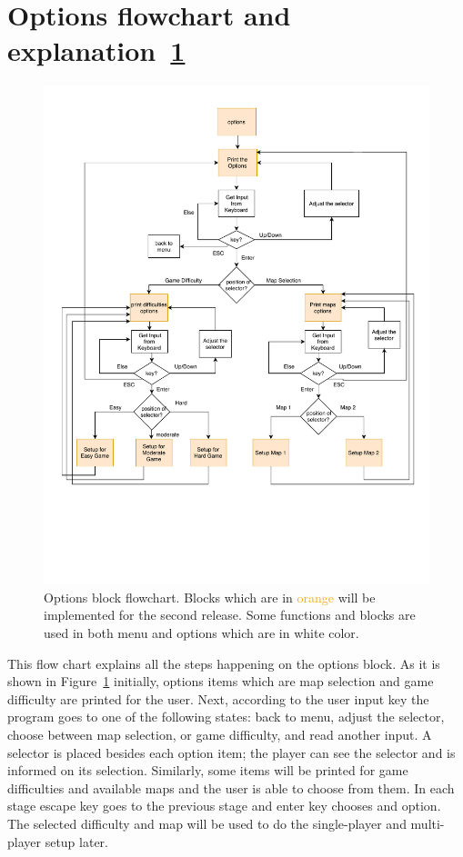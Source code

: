 \section{Options flowchart and explanation~\ref{fig:options}}

\begin{figure}
    \centering 
    \includegraphics[width=\columnwidth]{options.pdf}
    \caption{Options block flowchart. Blocks which are in \textcolor{orange}{orange} will be implemented for the second release. Some functions and blocks are used in both menu and options which are in white color.}
    \label{fig:options}
\end{figure}


This flow chart explains all the steps happening on the options block. 
As it is shown in Figure~\ref{fig:options} initially, options items which are map selection and game difficulty are printed for the user. 
Next, according to the user input key the program goes to one of the following states: 
back to menu, adjust the selector, choose between map selection, or game difficulty, and read another input. 
A selector is placed besides each option item; the player can see the selector and is informed on its selection.
Similarly, some items will be printed for game difficulties and available maps and the user is able to choose from them.
In each stage escape key goes to the previous stage and enter key chooses and option. 
The selected difficulty and map will be used to do the single-player and multi-player setup later.

